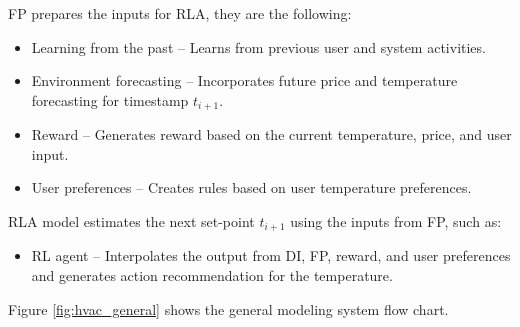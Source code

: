 FP prepares the inputs for RLA, they are the following:
\begin{itemize}
    \item Learning from the past -- Learns from previous user and system activities.
    \item Environment forecasting -- Incorporates future price and temperature forecasting for timestamp ${t_{i+1}}$.
    \item Reward -- Generates reward based on the current temperature, price, and user input.
    \item User preferences -- Creates rules based on user temperature preferences.
\end{itemize}

RLA model estimates the next set-point ${t_{i+1}}$ using the inputs from FP, such as: 
\begin{itemize}
    \item RL agent --  Interpolates the output from DI, FP, reward, and user preferences and generates action recommendation for the temperature.
\end{itemize}

Figure \ref{fig:hvac_general} shows the general modeling system flow chart. 






